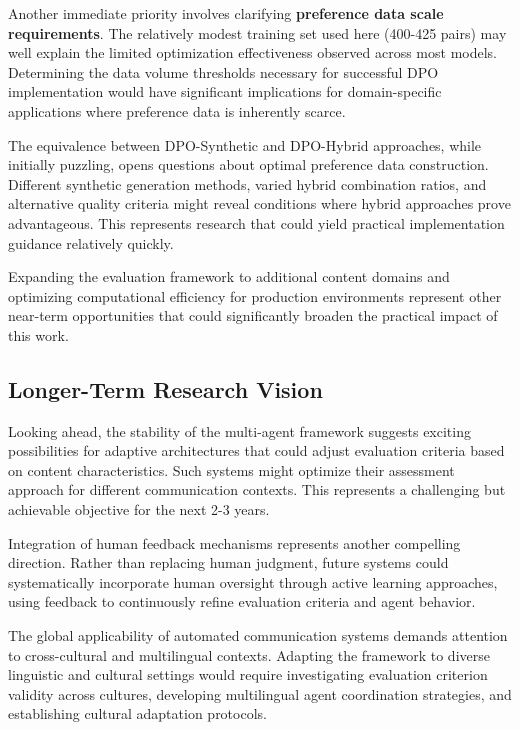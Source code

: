 Another immediate priority involves clarifying \textbf{preference data scale requirements}. The relatively modest training set used here (400-425 pairs) may well explain the limited optimization effectiveness observed across most models. Determining the data volume thresholds necessary for successful DPO implementation would have significant implications for domain-specific applications where preference data is inherently scarce.

The equivalence between DPO-Synthetic and DPO-Hybrid approaches, while initially puzzling, opens questions about optimal preference data construction. Different synthetic generation methods, varied hybrid combination ratios, and alternative quality criteria might reveal conditions where hybrid approaches prove advantageous. This represents research that could yield practical implementation guidance relatively quickly.

Expanding the evaluation framework to additional content domains and optimizing computational efficiency for production environments represent other near-term opportunities that could significantly broaden the practical impact of this work.

\subsection{Longer-Term Research Vision}

Looking ahead, the stability of the multi-agent framework suggests exciting possibilities for adaptive architectures that could adjust evaluation criteria based on content characteristics. Such systems might optimize their assessment approach for different communication contexts. This represents a challenging but achievable objective for the next 2-3 years.

Integration of human feedback mechanisms represents another compelling direction. Rather than replacing human judgment, future systems could systematically incorporate human oversight through active learning approaches, using feedback to continuously refine evaluation criteria and agent behavior.

The global applicability of automated communication systems demands attention to cross-cultural and multilingual contexts. Adapting the framework to diverse linguistic and cultural settings would require investigating evaluation criterion validity across cultures, developing multilingual agent coordination strategies, and establishing cultural adaptation protocols.

